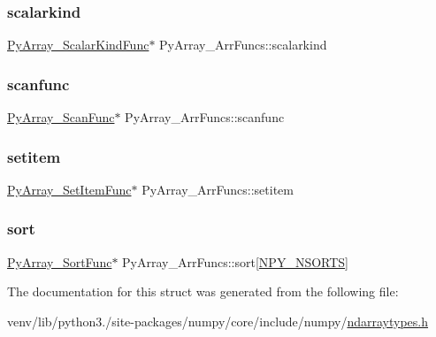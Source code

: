 \mbox{\label{structPyArray__ArrFuncs_a29af71d75758fac115ec942bb3d949f1}} 
\subsubsection{\texorpdfstring{scalarkind}{scalarkind}}
{\footnotesize\ttfamily \hyperlink{ndarraytypes_8h_acb1e2520f547b45ae355b2515876cf96}{Py\+Array\+\_\+\+Scalar\+Kind\+Func}$\ast$ Py\+Array\+\_\+\+Arr\+Funcs\+::scalarkind}

\mbox{\label{structPyArray__ArrFuncs_af844eb100b0145268ea5f825eadd163e}} 
\subsubsection{\texorpdfstring{scanfunc}{scanfunc}}
{\footnotesize\ttfamily \hyperlink{ndarraytypes_8h_a37b9c5b02b92ad8b164dca078e2eb92d}{Py\+Array\+\_\+\+Scan\+Func}$\ast$ Py\+Array\+\_\+\+Arr\+Funcs\+::scanfunc}

\mbox{\label{structPyArray__ArrFuncs_aa39f52bd4da731813293d757635d49e6}} 
\subsubsection{\texorpdfstring{setitem}{setitem}}
{\footnotesize\ttfamily \hyperlink{ndarraytypes_8h_aab048ca75fb31703762fda67d2666531}{Py\+Array\+\_\+\+Set\+Item\+Func}$\ast$ Py\+Array\+\_\+\+Arr\+Funcs\+::setitem}

\mbox{\label{structPyArray__ArrFuncs_ad13669f3742b69d65e767574ac434986}} 
\subsubsection{\texorpdfstring{sort}{sort}}
{\footnotesize\ttfamily \hyperlink{ndarraytypes_8h_ab1ed2c7a81f08167bf2ca8c544434944}{Py\+Array\+\_\+\+Sort\+Func}$\ast$ Py\+Array\+\_\+\+Arr\+Funcs\+::sort\mbox{[}\hyperlink{ndarraytypes_8h_a0267c2e5d8df5971c9b54b6231bca60b}{N\+P\+Y\+\_\+\+N\+S\+O\+R\+TS}\mbox{]}}



The documentation for this struct was generated from the following file\+:\begin{DoxyCompactItemize}
\item 
venv/lib/python3./site-\/packages/numpy/core/include/numpy/\hyperlink{ndarraytypes_8h}{ndarraytypes.\+h}\end{DoxyCompactItemize}
